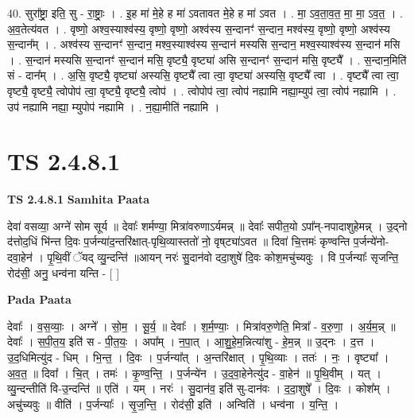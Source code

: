 \documentclass[17pt]{extarticle}
\begin{document}
40. सुरा᳚ष्ट्रा॒ इति॒ सु - रा॒ष्ट्राः॒ । . इ॒ह मा॑ मे॒हे ह मा॑ ऽवतावत मे॒हे ह मा॑ ऽवत । . मा॒ ऽव॒ता॒व॒त॒ मा॒ मा॒ ऽव॒त॒ । . अ॒व॒तेत्य॑वत । . वृष्णो॒ अश्व॒स्याश्व॑स्य॒ वृष्णो॒ वृष्णो॒ अश्व॑स्य स॒न्दानꣳ॑ स॒न्दान॒ मश्व॑स्य॒ वृष्णो॒ वृष्णो॒ अश्व॑स्य स॒न्दान᳚म् । . अश्व॑स्य स॒न्दानꣳ॑ स॒न्दान॒ मश्व॒स्याश्व॑स्य स॒न्दान॑ मस्यसि स॒न्दान॒ मश्व॒स्याश्व॑स्य स॒न्दान॑ मसि । . स॒न्दान॑ मस्यसि स॒न्दानꣳ॑ स॒न्दान॑ मसि॒ वृष्ट्यै॒ वृष्ट्या॑ असि स॒न्दानꣳ॑ स॒न्दान॑ मसि॒ वृष्ट्यै᳚ । . स॒न्दान॒मिति॑ सं - दान᳚म् । . अ॒सि॒ वृष्ट्यै॒ वृष्ट्या॑ अस्यसि॒ वृष्ट्यै᳚ त्वा त्वा॒ वृष्ट्या॑ अस्यसि॒ वृष्ट्यै᳚ त्वा । . वृष्ट्यै᳚ त्वा त्वा॒ वृष्ट्यै॒ वृष्ट्यै॒ त्वोपोप॑ त्वा॒ वृष्ट्यै॒ वृष्ट्यै॒ त्वोप॑ । . त्वोपोप॑ त्वा॒ त्वोप॑ नह्यामि नह्या॒म्युप॑ त्वा॒ त्वोप॑ नह्यामि । . उप॑ नह्यामि नह्या॒ म्युपोप॑ नह्यामि । . न॒ह्या॒मीति॑ नह्यामि । \newline
\pagebreak
{}
\section*{ TS 2.4.8.1 }

\textbf{TS 2.4.8.1 } \newline
\textbf{Samhita Paata} \newline

देवा॑ वसव्या॒ अग्ने॑ सोम सूर्य ॥ देवाः᳚ शर्मण्या॒ मित्रा॑वरुणाऽर्यमन्न् ॥ देवाः᳚ सपीत॒यो ऽपा᳚न्-नपादाशुहेमन्न् । उ॒द्नो द॑त्तोद॒धिं भि॑न्त्त दि॒वः प॒र्जन्या॑द॒न्तरि॑क्षात्-पृथि॒व्यास्ततो॑ नो॒ वृष्‌ट्या॑ऽवत ॥ दिवा॑ चि॒त्तमः॑ कृण्वन्ति प॒र्जन्ये॑नो-दवा॒हेन॑ । पृ॒थि॒वीं ॅयद् व्यु॒न्दन्ति॑ ॥आयन् नरः॑ सु॒दान॑वो ददा॒शुषे॑ दि॒वः कोश॒मचु॑च्यवुः । वि प॒र्जन्याः᳚ सृजन्ति॒ रोद॑सी॒ अनु॒ धन्व॑ना यन्ति - [  ] \newline

\textbf{Pada Paata} \newline

देवाः᳚ । व॒स॒व्याः॒ । अग्ने᳚ । सो॒म॒ । सू॒र्य॒ ॥ देवाः᳚ । श॒र्म॒ण्याः॒ । मित्रा॑वरु॒णेति॒ मित्रा᳚ - व॒रु॒णा॒ । अ॒र्य॒म॒न्न् ॥ देवाः᳚ । स॒पी॒त॒य॒ इति॑ स - पी॒त॒यः॒ । अपा᳚म् । न॒पा॒त् । आ॒शु॒हे॒म॒न्नित्या॑शु - हे॒म॒न्न् ॥ उ॒द्नः । द॒त्त । उ॒द॒धिमित्यु॑द - धिम् । भि॒न्त॒ । दि॒वः ।   प॒र्जन्या᳚त् । अ॒न्तरि॑क्षात् । पृ॒थि॒व्याः । ततः॑ । नः॒ । वृष्ट्या᳚ । अ॒व॒त॒ ॥ दिवा᳚ । चि॒त् । तमः॑ । कृ॒ण्व॒न्ति॒ । प॒र्जन्ये॑न । उ॒द॒वा॒हेनेत्यु॑द - वा॒हेन॑ ॥ पृ॒थि॒वीम् । यत् । व्यु॒न्दन्तीति॑ वि-उ॒न्दन्ति॑ ॥ एति॑ । यम् । नरः॑ । सु॒दान॑व॒ इति॑ सु-दान॑वः । द॒दा॒शुषे᳚ । दि॒वः । कोश᳚म् । अचु॑च्यवुः ॥ वीति॑ । प॒र्जन्याः᳚ । सृ॒ज॒न्ति॒ । रोद॑सी॒ इति॑ । अन्विति॑ । धन्व॑ना । य॒न्ति॒ ।  \newline
\end{document}
